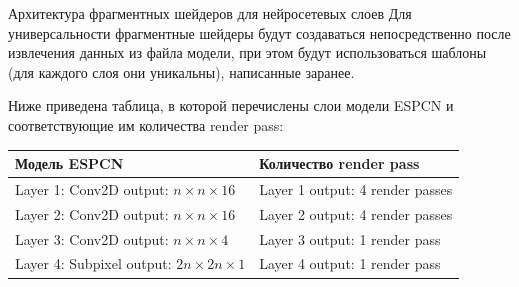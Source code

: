 \documentclass[aspectratio=169,xcolor=dvipsnames]{beamer}
\begin{document}

\begin{frame}{Архитектура фрагментных шейдеров для нейросетевых слоев}
    Для универсальности фрагментные шейдеры будут создаваться непосредственно после извлечения данных из файла модели, при этом будут использоваться шаблоны (для каждого слоя они уникальны), написанные заранее.
    
    Ниже приведена таблица, в которой перечислены слои модели ESPCN и соответствующие им количества render pass:

    \begin{table}[H]
        \begin{center}
            \begin{tabular}{|l|l|}
                \hline
                Модель ESPCN & Количество render pass \\
                \hline
                Layer 1: Conv2D output: $n \times n \times 16$ & Layer 1 output: 4 render passes \\
                \hline
                Layer 2: Conv2D output: $n \times n \times 16$ & Layer 2 output: 4 render passes \\
                \hline
                Layer 3: Conv2D output: $n \times n \times 4$ & Layer 3 output: 1 render pass \\
                \hline
                Layer 4: Subpixel output: $2n \times 2n \times 1$ & Layer 4 output: 1 render pass \\
                \hline
            \end{tabular}
        \end{center}
    \end{table}
\end{frame}

\end{document}
